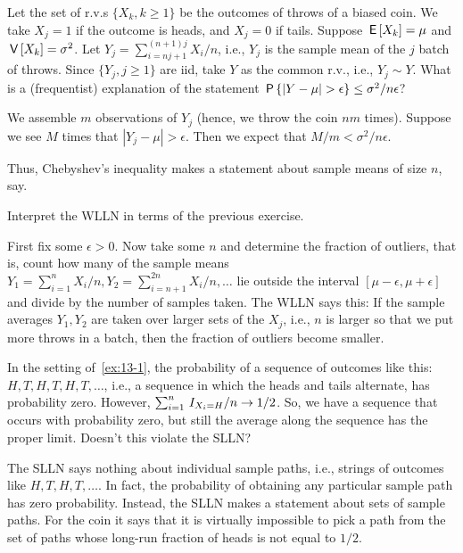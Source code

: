 \documentclass[../../assignments/assignments]{subfiles}
\begin{document}
\begin{exercise}\label{ex:13-1}
Let the set of r.v.s $\{X_{k}, k\geq 1\}$ be the outcomes of throws of a biased coin. We take $X_{j}=1$ if the outcome is heads, and $X_{j}=0$ if tails. Suppose $\,\mathsf{E}\left[X_{k}\right] = \mu$ and $\,\mathsf{V}\left[X_{k}\right] = \sigma^{2}$.
Let $Y_{j} = \sum_{i=n j + 1}^{(n+1)j} X_{i}/n$, i.e., $Y_{j}$ is the sample mean of the $j$ batch of throws. Since $\{Y_{j}, j\geq 1\}$ are iid, take $Y$ as the common r.v., i.e., $Y_{j} \sim Y$.
What is a (frequentist) explanation of the statement $\P{|Y-\mu|>\epsilon} \leq \sigma^{2}/n \epsilon$?
\begin{solution}
  We assemble $m$ observations of $Y_{j}$ (hence, we throw the coin $n m$ times).
  Suppose we see $M$ times that $|Y_{j} - \mu|> \epsilon$. Then we expect that $M/m < \sigma^{2}/n\epsilon$.

Thus,  Chebyshev's inequality makes a statement about sample means of size $n$, say.
\end{solution}
\end{exercise}

\begin{exercise}
Interpret the WLLN in terms of the previous exercise.
\begin{solution}
  First fix some $\epsilon>0$.
  Now take some $n$ and determine the fraction of outliers, that is, count how many of the sample means $Y_{1}=\sum_{i=1}^{n} X_{i}/n, Y_{2}=\sum_{i=n+1}^{2n} X_{i}/n, \ldots$ lie outside the interval $[\mu-\epsilon, \mu + \epsilon]$ and divide by the number of samples taken.
  The WLLN says this: If the sample averages $Y_{1}, Y_{2}$ are taken over larger sets of the $X_{j}$, i.e., $n$ is larger so that we put more throws in a batch, then the fraction of outliers become smaller.
\end{solution}
\end{exercise}


\begin{exercise}
In the setting of~\cref{ex:13-1}, the probability of a sequence of outcomes like this: $H, T, H, T, H, T,\ldots$, i.e., a sequence in which the heads and tails alternate, has probability zero. However, $\sum_{i=1}^{n}\,I_{X_{i}=H}/n \to 1/2$. So, we have a sequence that occurs with probability zero, but still the average along the sequence has the proper limit. Doesn't this violate the SLLN?
\begin{solution}
The SLLN says nothing about individual sample paths, i.e.,  strings of outcomes like $H, T, H, T, \ldots$. In fact, the probability of obtaining any particular sample path has zero probability. Instead, the SLLN makes a statement about sets of sample paths. For the coin it says that it is virtually impossible to pick a path from the set of paths whose  long-run fraction of heads is not equal to $1/2$.
\end{solution}
\end{exercise}
\end{document}
